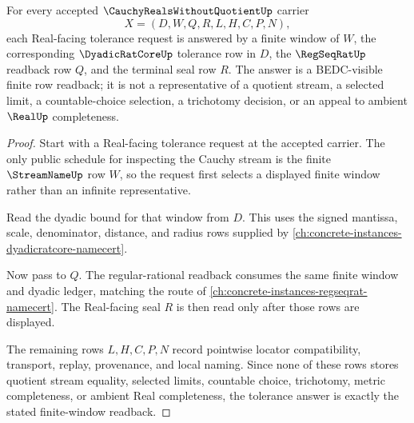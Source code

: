 \begin{theorem}
\label{thm:cauchy-reals-without-quotient-finite-window-tolerance-readback}
For every accepted $\CauchyRealsWithoutQuotientUp$ carrier
$$
X=(D,W,Q,R,L,H,C,P,N),
$$
each Real-facing tolerance request is answered by a finite window of $W$, the corresponding $\DyadicRatCoreUp$ tolerance row in $D$, the $\RegSeqRatUp$ readback row $Q$, and the terminal seal row $R$. The answer is a BEDC-visible finite row readback; it is not a representative of a quotient stream, a selected limit, a countable-choice selection, a trichotomy decision, or an appeal to ambient $\RealUp$ completeness.
\end{theorem}
\begin{proof}
Start with a Real-facing tolerance request at the accepted carrier. The only public schedule for inspecting the Cauchy stream is the finite $\StreamNameUp$ row $W$, so the request first selects a displayed finite window rather than an infinite representative.

Read the dyadic bound for that window from $D$. This uses the signed mantissa, scale, denominator, distance, and radius rows supplied by \autoref{ch:concrete-instances-dyadicratcore-namecert}.

Now pass to $Q$. The regular-rational readback consumes the same finite window and dyadic ledger, matching the route of \autoref{ch:concrete-instances-regseqrat-namecert}. The Real-facing seal $R$ is then read only after those rows are displayed.

The remaining rows $L,H,C,P,N$ record pointwise locator compatibility, transport, replay, provenance, and local naming. Since none of these rows stores quotient stream equality, selected limits, countable choice, trichotomy, metric completeness, or ambient Real completeness, the tolerance answer is exactly the stated finite-window readback.
\end{proof}

